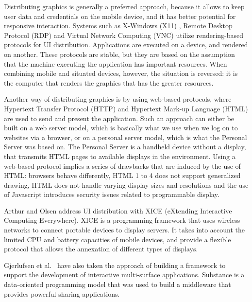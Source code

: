 Distributing graphics is generally a preferred approach, because it allows to keep user data and credentials on the mobile device, and it has better potential for responsive interaction.
Systems such as X-Windows (X11) \citep{Scheifler:1986:x11}, Remote Desktop Protocol (RDP) \citep{Tritsch:2003:rdp} and Virtual Network Computing (VNC) \citep{Richardson:1998:vnc} utilize rendering-based protocols for UI distribution.
Applications are executed on a device, and rendered on another.
These protocols are stable, but they are based on the assumption that the machine executing the application has important resources.
When combining mobile and situated devices, however, the situation is reversed: it is the computer that renders the graphics that has the greater resources.

Another way of distributing graphics is by using web-based protocols, where Hypertext Transfer Protocol (HTTP) and Hypertext Mark-up Language (HTML) are used to send and present the application.
Such an approach can either be built on a web server model, which is basically what we use when we log on to websites via a browser, or on a personal server model, which is what the Personal Server \citep{Want:2002:personalserver} was based on.
The Personal Server is a handheld device without a display, that transmits HTML pages to available displays in the environment.
Using a web-based protocol implies a series of drawbacks that are induced by the use of HTML: browsers behave differently, HTML 1 to 4 does not support generalized drawing, HTML does not handle varying display sizes and resolutions and the use of Javascript introduces security issues related to programmable display.

Arthur and Olsen \citeyearpar{Arthur:2011:xice} address UI distribution with XICE (eXtending Interactive Computing Everywhere).
XICE is a programming framework that uses wireless networks to connect portable devices to display servers.
It takes into account the limited CPU and battery capacities of mobile devices, and provide a flexible protocol that allows the annexation of different types of displays.

Gjerlufsen et al.\ \citeyearpar{Gjerlufsen:2011:substance} have also taken the approach of building a framework to support the development of interactive multi-surface applications.
Substance is a data-oriented programming model that was used to build a middleware that provides powerful sharing applications.



